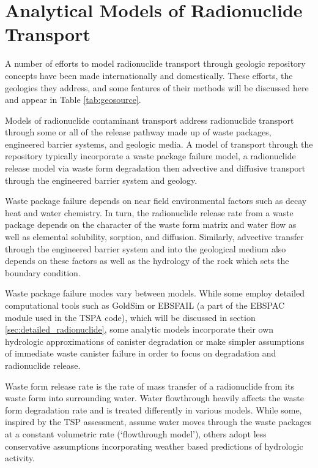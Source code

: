 
\section{Analytical Models of Radionuclide Transport} \label{sec:analytical_nuc}


A number of efforts to model radionuclide transport through geologic repository 
concepts have been made internationally and domestically. These efforts, the 
geologies they address, and  some features of their methods will be 
discussed here and appear in Table \ref{tab:geosource}.



Models of radionuclide contaminant transport address radionuclide transport 
through some or all of the release pathway made up of waste packages, 
engineered barrier systems, and geologic media. A model of transport through 
the repository typically incorporate a waste package failure model, a radionuclide 
release model via waste form degradation then advective and diffusive transport 
through the engineered barrier system and geology. 

Waste package failure depends on near field environmental factors such as decay 
heat and water chemistry.  In turn, the radionuclide release rate from a waste 
package depends on the character of the waste form matrix and water flow as 
well as elemental solubility, sorption, and diffusion.  Similarly, advective 
transfer through the engineered barrier system and into the geological medium 
also depends on these factors as well as the hydrology of the rock which sets 
the boundary condition.

Waste package failure modes vary between models. While some employ detailed 
computational tools such as GoldSim or EBSFAIL (a part of the EBSPAC module 
used in the TSPA code), which will be discussed in section 
\ref{sec:detailed_radionuclide}, some 
analytic models incorporate their own hydrologic approximations of
canister degradation or make simpler assumptions of immediate waste canister 
failure in order to focus on degradation and radionuclide release. 

Waste form release rate is the rate of mass transfer of a radionuclide from its 
waste form into surrounding water. Water flowthrough heavily affects the waste 
form degradation rate and is treated differently in various models.  While some, 
inspired by the TSP assessment, assume water moves through the waste packages at 
a constant volumetric rate (`flowthrough model'), others adopt less conservative 
assumptions incorporating weather based predictions of hydrologic activity.

